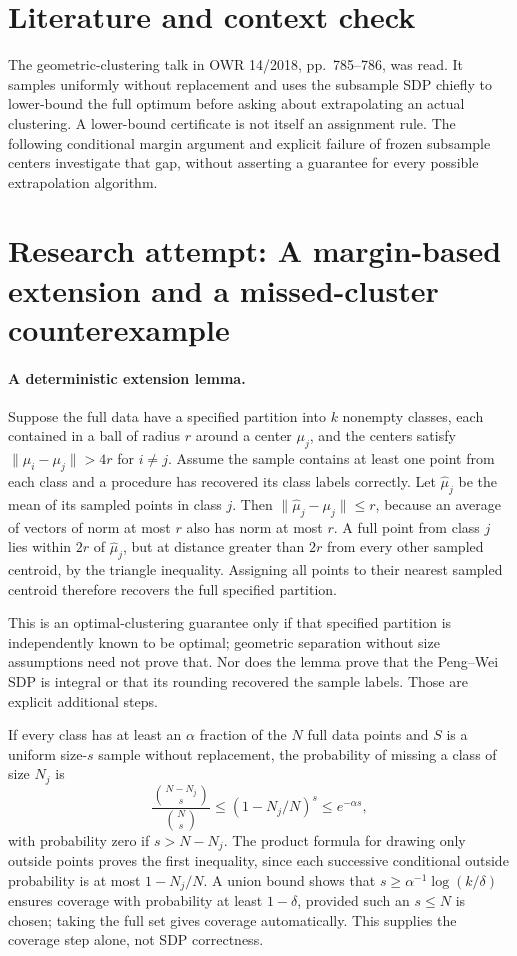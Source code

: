 \documentclass[11pt]{article}
\begin{document}
\section{Literature and context check}
The geometric-clustering talk in OWR 14/2018, pp.~785--786, was read. It samples uniformly without replacement and uses the subsample SDP chiefly to lower-bound the full optimum before asking about extrapolating an actual clustering. A lower-bound certificate is not itself an assignment rule. The following conditional margin argument and explicit failure of frozen subsample centers investigate that gap, without asserting a guarantee for every possible extrapolation algorithm.
\section{Research attempt: A margin-based extension and a missed-cluster counterexample}

\paragraph{A deterministic extension lemma.}
Suppose the full data have a specified partition into $k$ nonempty classes, each contained in a ball of radius $r$ around a center $\mu_j$, and the centers satisfy $\|\mu_i-\mu_j\|>4r$ for $i\ne j$. Assume the sample contains at least one point from each class and a procedure has recovered its class labels correctly. Let $\widehat\mu_j$ be the mean of its sampled points in class $j$. Then $\|\widehat\mu_j-\mu_j\|\le r$, because an average of vectors of norm at most $r$ also has norm at most $r$. A full point from class $j$ lies within $2r$ of $\widehat\mu_j$, but at distance greater than $2r$ from every other sampled centroid, by the triangle inequality. Assigning all points to their nearest sampled centroid therefore recovers the full specified partition.

This is an optimal-clustering guarantee only if that specified partition is independently known to be optimal; geometric separation without size assumptions need not prove that. Nor does the lemma prove that the Peng--Wei SDP is integral or that its rounding recovered the sample labels. Those are explicit additional steps.

If every class has at least an $\alpha$ fraction of the $N$ full data points and $S$ is a uniform size-$s$ sample without replacement, the probability of missing a class of size $N_j$ is
\[
 \frac{\binom{N-N_j}{s}}{\binom Ns}
 \le(1-N_j/N)^s\le e^{-\alpha s},
\]
with probability zero if $s>N-N_j$. The product formula for drawing only outside points proves the first inequality, since each successive conditional outside probability is at most $1-N_j/N$. A union bound shows that $s\ge\alpha^{-1}\log(k/\delta)$ ensures coverage with probability at least $1-\delta$, provided such an $s\le N$ is chosen; taking the full set gives coverage automatically. This supplies the coverage step alone, not SDP correctness.
\end{document}
